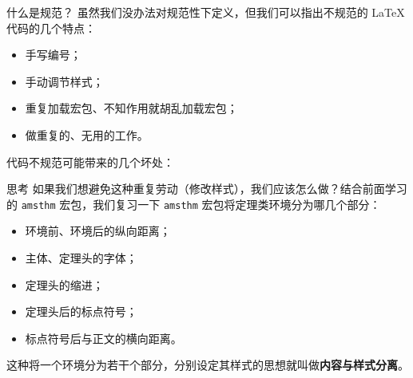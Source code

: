 \documentclass[aspectratio=169,fontset=none]{ctexbeamer}
\renewcommand{\emph}[1]{{\color{red}\bfseries #1}}
\newcommand{\pkg}[1]{\texttt{#1}}
\begin{document}
  \begin{frame}{什么是规范？}
    虽然我们没办法对规范性下定义，但我们可以指出不规范的 \LaTeX{} 代码的几个特点：
    \begin{itemize}
      \item 手写编号；
      \item 手动调节样式；
      \item 重复加载宏包、不知作用就胡乱加载宏包；
      \item 做重复的、无用的工作。
    \end{itemize}
    代码不规范可能带来的几个坏处：
  \end{frame}

  \begin{frame}{思考}
    如果我们想避免这种重复劳动（修改样式），我们应该怎么做？结合前面学习的 \pkg{amsthm} 宏包，我们复习一下 \pkg{amsthm} 宏包将定理类环境分为哪几个部分：\pause
    \begin{itemize}
      \item 环境前、环境后的纵向距离；
      \item 主体、定理头的字体；
      \item 定理头的缩进；
      \item 定理头后的标点符号；
      \item 标点符号后与正文的横向距离。
    \end{itemize}
    \pause
    这种将一个环境分为若干个部分，分别设定其样式的思想就叫做\emph{内容与样式分离}。
  \end{frame}
\end{document}
